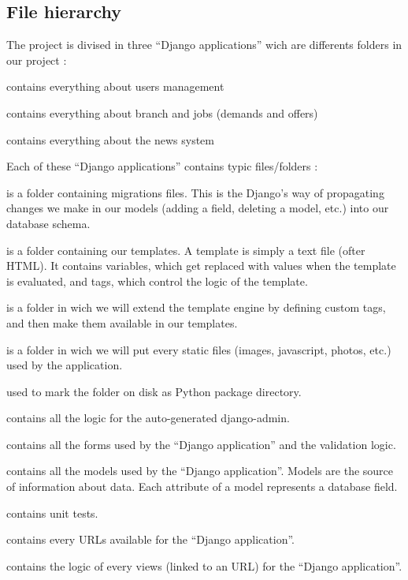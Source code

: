 \documentclass[11pt, a4paper]{article}   	%
\begin{document}
\subsection{File hierarchy}
The project is divised in three ``Django applications'' wich are differents folders in our project :
\begin{description}[noitemsep]
\item[- main] contains everything about users management
\item[- branch] contains everything about branch and jobs (demands and offers)
\item[- news] contains everything about the news system
\end{description}

Each of these ``Django applications'' contains typic files/folders :
\begin{description}[noitemsep]
\item[- migrations/] is a folder containing migrations files. This is the Django’s way of propagating changes we make in our models (adding a field, deleting a model, etc.) into our database schema.
\item[- templates/] is a folder containing our templates. A template is simply a text file (ofter HTML). It contains variables, which get replaced with values when the template is evaluated, and tags, which control the logic of the template.
\item[- Templatestags/] is a folder in wich we will extend the template engine by defining custom tags, and then make them available in our templates.
\item[- static/] is a folder in wich we will put every static files (images, javascript, photos, etc.) used by the application.
\item[- \_\_init\_\_.py] used to mark the folder on disk as Python package directory.
\item[- admin.py] contains all the logic for the auto-generated django-admin.
\item[- forms.py] contains all the forms used by the ``Django application'' and the validation logic.
\item[- models.py] contains all the models used by the ``Django application''. Models are the source of information about data. Each attribute of a model represents a database field. 
\item[- tests.py] contains unit tests.
\item[- urls.py] contains every URLs available for the ``Django application''.
\item[- views.py] contains the logic of every views (linked to an URL) for the ``Django application''.
\end{description}
\end{document}
